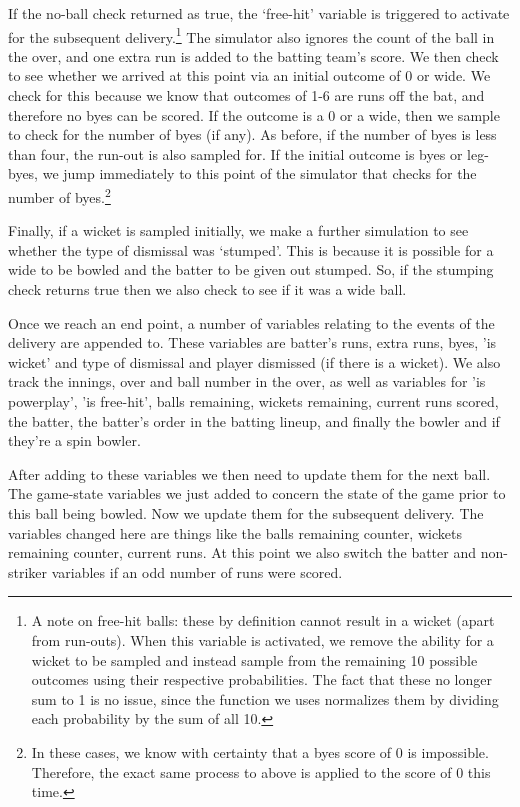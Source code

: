 If the no-ball check returned as true, the ‘free-hit’ variable is triggered to activate for the subsequent delivery.\footnote{A note on free-hit balls: these by definition cannot result in a wicket (apart from run-outs). When this variable is activated, we remove the ability for a wicket to be sampled and instead sample from the remaining 10 possible outcomes using their respective probabilities. The fact that these no longer sum to 1 is no issue, since the function we uses normalizes them by dividing each probability by the sum of all 10.} The simulator also ignores the count of the ball in the over, and one extra run is added to the batting team’s score. We then check to see whether we arrived at this point via an initial outcome of 0 or wide. We check for this because we know that outcomes of 1-6 are runs off the bat, and therefore no byes can be scored. If the outcome is a 0 or a wide, then we sample to check for the number of byes (if any). As before, if the number of byes is less than four, the run-out is also sampled for. If the initial outcome is byes or leg-byes, we jump immediately to this point of the simulator that checks for the number of byes.\footnote{In these cases, we know with certainty that a byes score of 0 is impossible. Therefore, the exact same process to above is applied to the score of 0 this time.}

Finally, if a wicket is sampled initially, we make a further simulation to see whether the type of dismissal was ‘stumped’. This is because it is possible for a wide to be bowled and the batter to be given out stumped. So, if the stumping check returns true then we also check to see if it was a wide ball.

Once we reach an end point, a number of variables relating to the events of the delivery are appended to. These variables are batter's runs, extra runs, byes, 'is wicket' and type of dismissal and player dismissed (if there is a wicket). We also track the innings, over and ball number in the over, as well as variables for 'is powerplay', 'is free-hit', balls remaining, wickets remaining, current runs scored, the batter, the batter's order in the batting lineup, and finally the bowler and if they're a spin bowler.

After adding to these variables we then need to update them for the next ball. The game-state variables we just added to concern the state of the game prior to this ball being bowled. Now we update them for the subsequent delivery. The variables changed here are things like the balls remaining counter, wickets remaining counter, current runs. At this point we also switch the batter and non-striker variables if an odd number of runs were scored.

